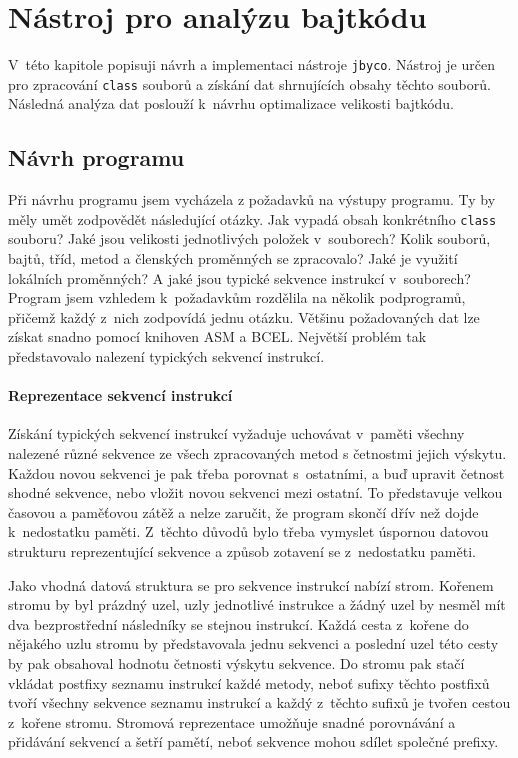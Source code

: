 \chapter{Nástroj pro analýzu bajtkódu}\label{Tool}



V~této kapitole popisuji návrh a implementaci nástroje \texttt{jbyco}. Nástroj je určen pro zpracování \texttt{class} souborů a získání dat shrnujících obsahy těchto souborů. Následná analýza dat poslouží k~návrhu optimalizace velikosti bajtkódu.

\section{Návrh programu}\label{ToolDesign}

Při návrhu programu jsem vycházela z požadavků na výstupy programu.
Ty by měly umět zodpovědět následující otázky. Jak vypadá obsah konkrétního \texttt{class} souboru? Jaké jsou velikosti jednotlivých položek v~souborech? Kolik souborů, bajtů, tříd, metod a členských proměnných se zpracovalo? Jaké je využití lokálních proměnných? A jaké jsou typické sekvence instrukcí v~souborech?
Program jsem vzhledem k~požadavkům rozdělila na několik podprogramů, přičemž každý z~nich zodpovídá jednu otázku. 
Většinu požadovaných dat lze získat snadno pomocí knihoven ASM a BCEL. Největší problém tak představovalo nalezení typických sekvencí instrukcí.

\subsubsection{Reprezentace sekvencí instrukcí}

Získání typických sekvencí instrukcí vyžaduje uchovávat v~paměti všechny nalezené různé sekvence ze všech zpracovaných metod s četnostmi jejich výskytu. Každou novou sekvenci je pak třeba porovnat s~ostatními, a buď upravit četnost shodné sekvence, nebo vložit novou sekvenci mezi ostatní. To představuje velkou časovou a paměťovou zátěž a nelze zaručit, že program skončí dřív než dojde k~nedostatku paměti. Z~těchto důvodů bylo třeba vymyslet úspornou datovou strukturu reprezentující sekvence a způsob zotavení se z~nedostatku paměti.

Jako vhodná datová struktura se pro sekvence instrukcí nabízí strom. Kořenem stromu by byl prázdný uzel, uzly jednotlivé instrukce a žádný uzel by nesměl mít dva bezprostřední následníky se stejnou instrukcí. Každá cesta z~kořene do nějakého uzlu stromu by představovala jednu sekvenci a poslední uzel této cesty by pak obsahoval hodnotu četnosti výskytu sekvence. Do stromu pak stačí vkládat postfixy seznamu instrukcí každé metody, neboť sufixy těchto postfixů tvoří všechny sekvence seznamu instrukcí a každý z~těchto sufixů je tvořen cestou z~kořene stromu. Stromová reprezentace umožňuje snadné porovnávání a přidávání sekvencí a šetří pamětí, neboť sekvence mohou sdílet společné prefixy.

